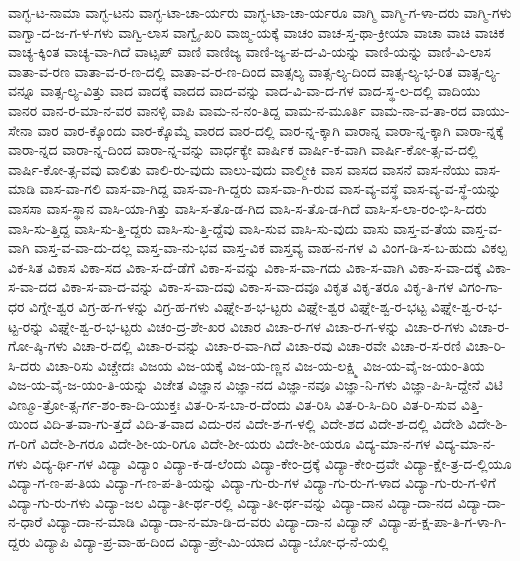 {ವಾಗ್ಭ-ಟ-ನಾಮಾ
ವಾಗ್ಭ-ಟನು
ವಾಗ್ಭ-ಟಾ-ಚಾ-ರ್ಯರು
ವಾಗ್ಭ-ಟಾ-ಚಾ-ರ್ಯರೂ
ವಾಗ್ಮಿ
ವಾಗ್ಮಿ-ಗ-ಳಾ-ದರು
ವಾಗ್ಮಿ-ಗಳು
ವಾಗ್ವಾ-ದ-ಜ-ಗ-ಳ-ಗಳು
ವಾಗ್ವಿ-ಲಾಸ
ವಾಗ್ವೈ-ಖರಿ
ವಾಙ್ಮ-ಯಕ್ಕೆ
ವಾಚಂ
ವಾಚ-ಸ್ತ-ಥಾ-ಕ್ರೀಯಾ
ವಾಚಾ
ವಾಚಿ
ವಾಚಿಕ
ವಾಚ್ಯ-ಕ್ಕಿಂತ
ವಾಚ್ಯ-ವಾ-ಗಿದೆ
ವಾಟ್ಸಪ್
ವಾಣಿ
ವಾಣಿಜ್ಯ
ವಾಣಿ-ಜ್ಯ-ಪ-ದ-ವಿ-ಯನ್ನು
ವಾಣಿ-ಯನ್ನು
ವಾಣಿ-ವಿ-ಲಾಸ
ವಾತಾ-ವ-ರಣ
ವಾತಾ-ವ-ರ-ಣ-ದಲ್ಲಿ
ವಾತಾ-ವ-ರ-ಣ-ದಿಂದ
ವಾತ್ಸಲ್ಯ
ವಾತ್ಸ-ಲ್ಯ-ದಿಂದ
ವಾತ್ಸ-ಲ್ಯ-ಭ-ರಿತ
ವಾತ್ಸ-ಲ್ಯ-ವನ್ನೂ
ವಾತ್ಸ-ಲ್ಯ-ವಿತ್ತು
ವಾದ
ವಾದಕ್ಕೆ
ವಾದದ
ವಾದ-ವನ್ನು
ವಾದ-ವಿ-ವಾ-ದ-ಗಳ
ವಾದ-ಸ್ಥ-ಲ-ದಲ್ಲಿ
ವಾದಿಯು
ವಾನರ
ವಾನ-ರ-ಮಾ-ನ-ವರ
ವಾನಳ್ಳಿ
ವಾಪಿ
ವಾಮ-ನ-ನಂ-ತಿದ್ದ
ವಾಮ-ನ-ಮೂರ್ತಿ
ವಾಮ-ನಾ-ವ-ತಾ-ರದ
ವಾಯು-ಸೇನಾ
ವಾರ
ವಾರ-ಕ್ಕೊಂದು
ವಾರ-ಕ್ಕೊಮ್ಮೆ
ವಾರದ
ವಾರ-ದಲ್ಲಿ
ವಾರ-ನ್ನ-ಕ್ಕಾಗಿ
ವಾರಾನ್ನ
ವಾರಾ-ನ್ನ-ಕ್ಕಾಗಿ
ವಾರಾ-ನ್ನಕ್ಕೆ
ವಾರಾ-ನ್ನದ
ವಾರಾ-ನ್ನ-ದಿಂದ
ವಾರಾ-ನ್ನ-ವನ್ನು
ವಾರ್ಧಕ್ಯೇ
ವಾರ್ಷಿಕ
ವಾರ್ಷಿ-ಕ-ವಾಗಿ
ವಾರ್ಷಿ-ಕೋ-ತ್ಸ-ವ-ದಲ್ಲಿ
ವಾರ್ಷಿ-ಕೋ-ತ್ಸ-ವವು
ವಾಲಿತು
ವಾಲಿ-ರು-ವುದು
ವಾಲು-ವುದು
ವಾಲ್ಮೀಕಿ
ವಾಸ
ವಾಸದ
ವಾಸನೆ
ವಾಸ-ನೆಯು
ವಾಸ-ಮಾಡಿ
ವಾಸ-ವಾ-ಗಲಿ
ವಾಸ-ವಾ-ಗಿದ್ದ
ವಾಸ-ವಾ-ಗಿ-ದ್ದರು
ವಾಸ-ವಾ-ಗಿ-ರುವ
ವಾಸ-ವ್ಯ-ವಸ್ಥೆ
ವಾಸ-ವ್ಯ-ವ-ಸ್ಥೆ-ಯನ್ನು
ವಾಸಸಾ
ವಾಸ-ಸ್ಥಾನ
ವಾಸಿ-ಯಾ-ಗಿತ್ತು
ವಾಸಿ-ಸ-ತೊ-ಡ-ಗಿದ
ವಾಸಿ-ಸ-ತೊ-ಡ-ಗಿದೆ
ವಾಸಿ-ಸ-ಲಾ-ರಂ-ಭಿ-ಸಿ-ದರು
ವಾಸಿ-ಸು-ತ್ತಿದ್ದ
ವಾಸಿ-ಸು-ತ್ತಿ-ದ್ದರು
ವಾಸಿ-ಸು-ತ್ತಿ-ದ್ದೆವು
ವಾಸಿ-ಸುವ
ವಾಸಿ-ಸು-ವುದು
ವಾಸು
ವಾಸ್ತ-ವ-ತೆಯ
ವಾಸ್ತ-ವ-ವಾಗಿ
ವಾಸ್ತ-ವ-ವಾ-ದು-ದಲ್ಲ
ವಾಸ್ತ-ವಾ-ನು-ಭವ
ವಾಸ್ತ-ವಿಕ
ವಾಸ್ತವ್ಯ
ವಾಹ-ನ-ಗಳ
ವಿ
ವಿಂಗ-ಡಿ-ಸ-ಬ-ಹುದು
ವಿಕಲ್ಪ
ವಿಕ-ಸಿತ
ವಿಕಾಸ
ವಿಕಾ-ಸದ
ವಿಕಾ-ಸ-ದೆ-ಡೆಗೆ
ವಿಕಾ-ಸ-ವನ್ನು
ವಿಕಾ-ಸ-ವಾ-ಗದು
ವಿಕಾ-ಸ-ವಾಗಿ
ವಿಕಾ-ಸ-ವಾ-ದಕ್ಕೆ
ವಿಕಾ-ಸ-ವಾ-ದದ
ವಿಕಾ-ಸ-ವಾ-ದ-ವನ್ನು
ವಿಕಾ-ಸ-ವಾ-ದವು
ವಿಕಾ-ಸ-ವಾ-ದವೂ
ವಿಕೃತ
ವಿಕೃ-ತರೂ
ವಿಕೃ-ತಿ-ಗಳ
ವಿಗಂ-ಗಾ-ಧರ
ವಿಗ್ನೇ-ಶ್ವರ
ವಿಗ್ರ-ಹ-ಗ-ಳನ್ನು
ವಿಗ್ರ-ಹ-ಗಳು
ವಿಘ್ನೇ-ಶ-ಭ-ಟ್ಟರು
ವಿಘ್ನೇ-ಶ್ವರ
ವಿಘ್ನೇ-ಶ್ವ-ರ-ಭಟ್ಟ
ವಿಘ್ನೇ-ಶ್ವ-ರ-ಭ-ಟ್ಟ-ರನ್ನು
ವಿಘ್ನೇ-ಶ್ವ-ರ-ಭ-ಟ್ಟರು
ವಿಚಂ-ದ್ರ-ಶೇ-ಖರ
ವಿಚಾರ
ವಿಚಾ-ರ-ಗಳ
ವಿಚಾ-ರ-ಗ-ಳನ್ನು
ವಿಚಾ-ರ-ಗಳು
ವಿಚಾ-ರ-ಗೋ-ಷ್ಠಿ-ಗಳು
ವಿಚಾ-ರ-ದಲ್ಲಿ
ವಿಚಾ-ರ-ವನ್ನು
ವಿಚಾ-ರ-ವಾ-ಗಿದೆ
ವಿಚಾ-ರವು
ವಿಚಾ-ರವೇ
ವಿಚಾ-ರ-ಸ-ರಣಿ
ವಿಚಾ-ರಿ-ಸಿ-ದರು
ವಿಚಾ-ರಿಸು
ವಿಚ್ಚೇದಃ
ವಿಜಯ
ವಿಜ-ಯಕ್ಕೆ
ವಿಜ-ಯ-ಣ್ಣನ
ವಿಜ-ಯ-ಲಕ್ಷ್ಮಿ
ವಿಜ-ಯ-ವೈ-ಜ-ಯಂ-ತಿಯ
ವಿಜ-ಯ-ವೈ-ಜ-ಯಂ-ತಿ-ಯನ್ನು
ವಿಜೇತ
ವಿಜ್ಞಾನ
ವಿಜ್ಞಾ-ನದ
ವಿಜ್ಞಾ-ನವೂ
ವಿಜ್ಞಾ-ನಿ-ಗಳು
ವಿಜ್ಞಾ-ಪಿ-ಸಿ-ದ್ದೇನೆ
ವಿಟಿ
ವಿಣ್ಮೂ-ತ್ರೋ-ತ್ಸ-ರ್ಗ-ಶಂ-ಕಾ-ದಿ-ಯುಕ್ತಃ
ವಿತ-ರಿ-ಸ-ಬಾ-ರ-ದೆಂದು
ವಿತ-ರಿಸಿ
ವಿತ-ರಿ-ಸಿ-ದಿರಿ
ವಿತ-ರಿ-ಸುವ
ವಿತ್ತಿ-ಯಿಂದ
ವಿದಿ-ತ-ವಾ-ಗು-ತ್ತದೆ
ವಿದಿ-ತ-ವಾದ
ವಿದು-ರನ
ವಿದೇ-ಶ-ಗ-ಳಲ್ಲಿ
ವಿದೇ-ಶದ
ವಿದೇ-ಶ-ದಲ್ಲಿ
ವಿದೇಶಿ
ವಿದೇ-ಶಿ-ಗ-ರಿಗೆ
ವಿದೇ-ಶಿ-ಗರೂ
ವಿದೇ-ಶೀ-ಯ-ರಿಗೂ
ವಿದೇ-ಶೀ-ಯರು
ವಿದೇ-ಶೀ-ಯರೂ
ವಿದ್ಯ-ಮಾ-ನ-ಗಳ
ವಿದ್ಯ-ಮಾ-ನ-ಗಳು
ವಿದ್ಯ-ರ್ಥಿ-ಗಳ
ವಿದ್ಯಾ
ವಿದ್ಯಾಂ
ವಿದ್ಯಾ-ಕ-ಡ-ಲೆಂದು
ವಿದ್ಯಾ-ಕೇಂ-ದ್ರಕ್ಕೆ
ವಿದ್ಯಾ-ಕೇಂ-ದ್ರವೇ
ವಿದ್ಯಾ-ಕ್ಷೇ-ತ್ರ-ದ-ಲ್ಲಿಯೂ
ವಿದ್ಯಾ-ಗ-ಣ-ಪ-ತಿಯ
ವಿದ್ಯಾ-ಗ-ಣ-ಪ-ತಿ-ಯನ್ನು
ವಿದ್ಯಾ-ಗು-ರು-ಗಳ
ವಿದ್ಯಾ-ಗು-ರು-ಗ-ಳಾದ
ವಿದ್ಯಾ-ಗು-ರು-ಗ-ಳಿಗೆ
ವಿದ್ಯಾ-ಗು-ರು-ಗಳು
ವಿದ್ಯಾ-ಜಲ
ವಿದ್ಯಾ-ತೀ-ರ್ಥ-ರಲ್ಲಿ
ವಿದ್ಯಾ-ತೀ-ರ್ಥ-ವನ್ನು
ವಿದ್ಯಾ-ದಾನ
ವಿದ್ಯಾ-ದಾ-ನದ
ವಿದ್ಯಾ-ದಾ-ನ-ಧಾರೆ
ವಿದ್ಯಾ-ದಾ-ನ-ಮಾಡಿ
ವಿದ್ಯಾ-ದಾ-ನ-ಮಾ-ಡಿ-ದ-ವರು
ವಿದ್ಯಾ-ದಾ-ನ
ವಿದ್ಯಾನ್
ವಿದ್ಯಾ-ಪ-ಕ್ಷ-ಪಾ-ತಿ-ಗ-ಳಾ-ಗಿ-ದ್ದರು
ವಿದ್ಯಾಪಿ
ವಿದ್ಯಾ-ಪ್ರ-ವಾ-ಹ-ದಿಂದ
ವಿದ್ಯಾ-ಪ್ರೇ-ಮಿ-ಯಾದ
ವಿದ್ಯಾ-ಬೋ-ಧ-ನೆ-ಯಲ್ಲಿ
}
